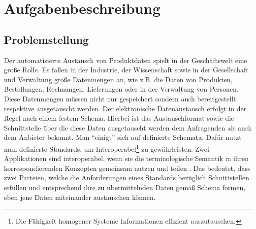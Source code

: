 \chapter{Aufgabenbeschreibung} \label{kap:aufgabenbeschreibung}

\section{Problemstellung}\label{sec:problemstellung}


Der automatisierte Austausch von Produktdaten spielt in der Geschäftswelt eine große Rolle. Es fallen in der Industrie, der Wissenschaft sowie in der Gesellschaft und Verwaltung große Datenmengen an, wie z.B. die Daten von Produkten, Bestellungen, Rechnungen, Lieferungen oder in der Verwaltung von Personen. Diese Datenmengen müssen nicht nur gespeichert sondern auch bereitgestellt respektive ausgetauscht werden. Der elektronische Datenaustausch erfolgt in der Regel nach einem festem Schema. Hierbei ist das Austauschformat sowie die Schnittstelle über die diese Daten ausgetauscht werden dem Anfragenden als auch dem Anbieter bekannt. Man \enquote{einigt} sich auf definierte Schemata. Dafür nutzt man definierte Standards, um \gls{Interoperabel}\footnote{Die Fähigkeit homogener Systeme Informationen effizient auszutauschen.} zu gewährleisten. Zwei Applikationen sind interoperabel, wenn sie die terminologische Semantik in ihren korrespondierenden Konzepten gemeinsam nutzen und teilen \citep[vgl.][S. 23f]{Hemmje}. 
Das bedeutet, dass zwei Parteien, welche die Anforderungen eines Standards bezüglich Schnittstellen erfüllen und entsprechend ihre zu übermittelnden Daten gemäß Schema formen, eben jene Daten miteinander austauschen können. 

